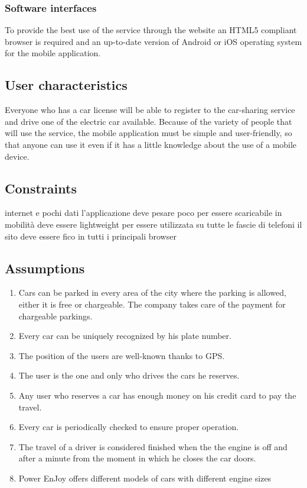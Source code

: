 \subsubsection{Software interfaces}
To provide the best use of the service through the website an HTML5 compliant browser is required and an up-to-date version of Android or iOS operating system for the mobile application.





\subsection{User characteristics}
Everyone who has a car license will be able to register to the car-sharing service and drive one of the electric car available.
Because of the variety of people that will use the service, the mobile application must be simple and user-friendly, so that anyone can use it even if it has a little knowledge about the use of a mobile device.

\subsection{Constraints}

internet e pochi dati
l'applicazione deve pesare poco per essere scaricabile in mobilità 
deve essere lightweight per essere utilizzata su tutte le fascie di telefoni
il sito deve essere fico in tutti i principali browser



\subsection{Assumptions}
\begin{enumerate}
	\item Cars can be parked in every area of the city where the parking is allowed, either it is free or chargeable. The company 		                    takes care of the payment for chargeable parkings. 
	\item Every car can be uniquely recognized by his plate number.
	\item The position of the users are well-known thanks to GPS.
	\item The user is the one and only who drives the cars he reserves.
	\item Any user who reserves a car has enough money on his credit card to pay the travel.
	\item Every car is periodically checked to ensure proper operation.
	\item The travel of a driver is considered finished when the the engine is off and after a minute from the moment in which he closes the car doors.
	\item Power EnJoy offers different models of cars with different engine sizes
\end{enumerate}

